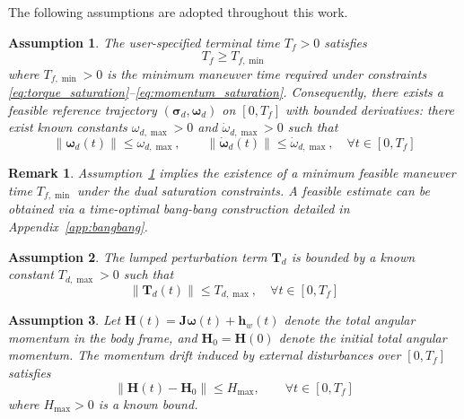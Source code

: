 \documentclass[journal]{new-aiaa}
\newtheorem{remark}{Remark}
\newtheorem{assumption}{Assumption}
\begin{document}
The following assumptions are adopted throughout this work.


\begin{assumption}\label{ass:feasible_Tf}
The user-specified terminal time $T_f>0$ satisfies
\begin{equation}
T_f \ge T_{f,\min}
\label{eq:T_f_feasible}
\end{equation}
where $T_{f,\min}>0$ is the minimum maneuver time required under constraints \eqref{eq:torque_saturation}--\eqref{eq:momentum_saturation}.
Consequently, there exists a feasible reference trajectory $(\boldsymbol{\sigma}_d,\boldsymbol{\omega}_d)$ on $[0,T_f]$
with bounded derivatives: there exist known constants $\omega_{d,\max}>0$ and $\dot{\omega}_{d,\max}>0$ such that
\begin{equation}
\|\boldsymbol{\omega}_d(t)\| \le \omega_{d,\max}, \qquad
\|\dot{\boldsymbol{\omega}}_d(t)\| \le \dot{\omega}_{d,\max},\quad \forall t\in[0,T_f]
\label{eq:ref_bounded}
\end{equation}
\end{assumption}

\begin{remark}
Assumption~\ref{ass:feasible_Tf} implies the existence of a minimum feasible maneuver time $T_{f,\min}$ under the dual saturation
constraints. A feasible estimate can be obtained via a time-optimal bang-bang construction detailed in Appendix~\ref{app:bangbang}.
\end{remark}

\begin{assumption}\label{ass:disturbance_bound}
The lumped perturbation term $\boldsymbol{T}_d$ is bounded by a known 
constant $T_{d,\max}>0$ such that
\begin{equation}
\|\boldsymbol{T}_d(t)\| \le T_{d,\max}, \quad \forall t\in[0,T_f]
\label{eq:Td_bound}
\end{equation}
\end{assumption}

\begin{assumption}\label{ass:H_budget}
Let $\boldsymbol{H}(t)=\boldsymbol{J}\boldsymbol{\omega}(t)+\boldsymbol{h}_w(t)$ denote the total angular momentum in the body frame,
and $\boldsymbol{H}_0=\boldsymbol{H}(0)$ denote the initial total angular momentum.
The momentum drift induced by external disturbances over $[0,T_f]$ satisfies
\begin{equation}
\|\boldsymbol{H}(t)-\boldsymbol{H}_0\| \le H_{\max}, \qquad \forall t \in [0, T_f]
\label{eq:Hmax}
\end{equation}
where $H_{\max} > 0$ is a known bound.
\end{assumption}
\end{document}
